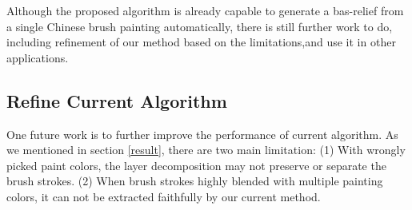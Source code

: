 Although the proposed algorithm is already capable to generate a bas-relief from a single Chinese brush painting automatically, there is still further work to do, including refinement of our method based on the limitations,and use it in other applications.

\subsection{Refine Current Algorithm}
One future work is to further improve the performance of current algorithm. As we mentioned in section \ref{result}, there are two main limitation: (1) With wrongly picked paint colors, the layer decomposition may not preserve or separate the brush strokes. (2) When brush strokes highly blended with  multiple painting colors, it can not be extracted faithfully by our current method.

